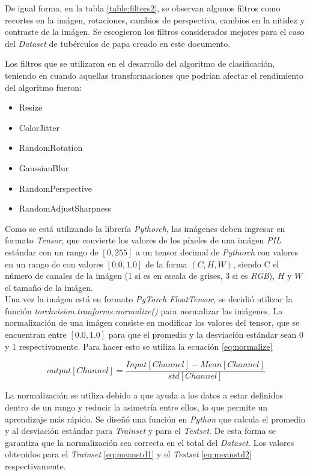 			De igual forma, en la tabla \ref{table:filters2}, se observan algunos filtros como recortes en la imágen, rotaciones, cambios de perspectiva, cambios en la nitidez y contraste de la imágen. Se escogieron los filtros considerados mejores para el caso del \textit{Dataset} de tubérculos de papa creado en este documento. 
			
			
			
			\newpage
			Los filtros que se utilizaron en el desarrollo del algoritmo de clasificación, teniendo en cuando aquellas transformaciones que podrían afectar el rendimiento del algoritmo fueron:
			
			\begin{itemize}
				\item Resize
				\item ColorJitter
				\item RandomRotation
				\item GaussianBlur
				\item RandomPerspective
				\item RandomAdjustSharpness
			\end{itemize}

			Como se está utilizando la librería \textit{Pythorch}, las imágenes deben ingresar en formato \textit{Tensor}, que convierte los valores de los píxeles de una imágen \textit{PIL} estándar con un rango de $[0, 255]$  a un tensor decimal de \textit{Pythorch} con valores en un rango de con valores $[0.0, 1.0]$ de la forma  $(C, H, W)$, siendo C el número de canales de la imágen (1 si es en escala de grises, 3 si es \textit{RGB}), $H$ y $W$ el tamaño de la imágen. \\
			
			Una vez la imágen está en formato \textit{PyTorch FloatTensor}, se decidió utilizar la función \textit{torchvision.tranforms.normalize()} para normalizar las imágenes. La normalización de una imágen consiste en modificar los valores del tensor, que se encuentran entre $[0.0, 1.0]$ para que el promedio y la desviación estándar sean $0$ y $1$ respectivamente. Para hacer esto se utiliza la ecuación \ref{eq:normalize} \cite{Pytorch}
			
			\begin{equation}
				{output[Channel]=\frac{Input[Channel]-Mean[Channel]}{std[Channel]}}
				\label{eq:normalize}
			\end{equation}

			La normalización se utiliza debido a que ayuda a los datos a estar definidos dentro de un rango y reducir la asimetría entre ellos, lo que permite un aprendizaje más rápido. Se diseñó una función en \textit{Python} que calcula el promedio y al desviación estándar para \textit{Trainset} y para el \textit{Testset}. De esta forma se garantiza que la normalización sea correcta en el total del \textit{Dataset}. Los valores obtenidos para el \textit{Trainset} \ref{eq:meanstd1} y el \textit{Testset} \ref{eq:meanstd2} respectivamente.
			
